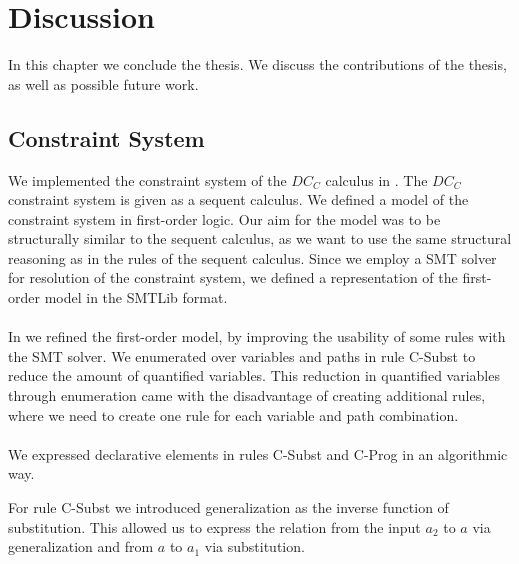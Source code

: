 \chapter{Discussion}
In this chapter we conclude the thesis.
We discuss the contributions of the thesis,
as well as possible future work.

\section{Constraint System}
We implemented the constraint system of the $DC_C$ calculus
in .
The $DC_C$ constraint system is given as a sequent calculus.
We defined a model of the constraint system in first-order logic.
Our aim for the model was to be structurally similar to the sequent calculus,
as we want to use the same structural reasoning
as in the rules of the sequent calculus.
Since we employ a SMT solver for resolution of the constraint system,
we defined a representation of the first-order model in the SMTLib format.\\
\\
In  we refined the first-order model,
by improving the usability of some rules with the SMT solver.
We enumerated over variables and paths in rule C-Subst
to reduce the amount of quantified variables.
This reduction in quantified variables through enumeration came
with the disadvantage of creating additional rules,
where we need to create one rule for each variable and path combination.\\
\\
We expressed declarative elements in rules C-Subst and C-Prog in an algorithmic way.

For rule C-Subst we introduced generalization as the inverse function of substitution.
This allowed us to express the relation from the input $a_2$ to $a$ via generalization
and from $a$ to $a_1$ via substitution.

